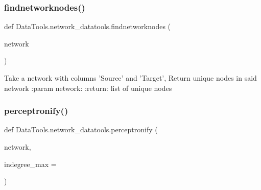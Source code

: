 \subsubsection{\texorpdfstring{findnetworknodes()}{findnetworknodes()}}
{\footnotesize\ttfamily def Data\+Tools.\+network\+\_\+datatools.\+findnetworknodes (\begin{DoxyParamCaption}\item[{}]{network }\end{DoxyParamCaption})}

\begin{DoxyVerb}Take a network with columns 'Source' and 'Target',
Return unique nodes in said network
:param network:
:return: list of unique nodes
\end{DoxyVerb}
 \mbox{\label{namespace_data_tools_1_1network__datatools_a3454d576ee67753afd1470118377dab5}} 
\subsubsection{\texorpdfstring{perceptronify()}{perceptronify()}}
{\footnotesize\ttfamily def Data\+Tools.\+network\+\_\+datatools.\+perceptronify (\begin{DoxyParamCaption}\item[{}]{network,  }\item[{}]{indegree\+\_\+max = {} }\end{DoxyParamCaption})}

